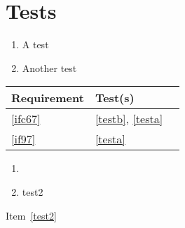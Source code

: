 \documentclass{report}
\begin{document}
\section{Tests}
\begin{enumerate}[label=Test\alph*.,ref=Test\alph*,nosep]
	\item \label{testa} A test
	\item \label{testb} Another test
\end{enumerate}

\begin{tabular}{|l|l|l|}
	\hline
	Requirement & Test(s) \\
	\hline
	\hline
	\ref{ifc67} & \ref{testb}, \ref{testa} \\
	\hline
	\ref{if97} & \ref{testa} \\
	\hline
\end{tabular}





\begin{enumerate} [label=X\arabic*.,ref=X\arabic*,nosep]
\item 
\item test2 \label{test2}
\end{enumerate}
Item~\ref{test2}
\end{document}
